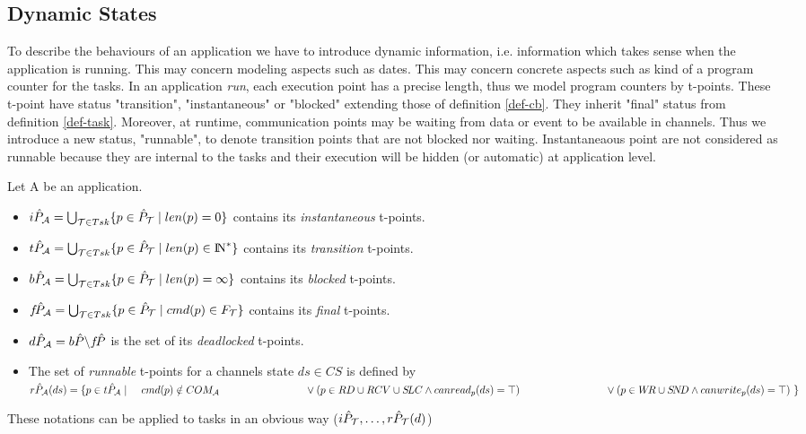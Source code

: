 \documentclass{article}
\newcommand{\NAT}{\mbox{\normalfont I$\!$N}}
\begin{document}
\subsection{Dynamic States}\label{sec-dst}
To describe the behaviours of an application we have to introduce dynamic information, i.e. information which takes sense when the application is running. This may concern modeling aspects such as dates. This may concern concrete aspects such as kind of a program counter for the tasks. In an application {\em run}, each execution point has a precise length, thus we model program counters by t-points. These t-point have status "transition", "instantaneous" or "blocked" extending those of definition \ref{def-cb}. They inherit "final" status from definition \ref{def-task}. Moreover, at runtime, communication points may be waiting from data or event to be available in channels. Thus we introduce a new status, "runnable", to denote transition points that are not blocked nor waiting. Instantaneaous point are not considered as runnable because they are internal to the tasks and their execution will be hidden (or automatic) at application level.
\begin{definition}\label{def-tpstat} Let {\cal A} be an application. 
\begin{itemize}
      \item $i\hat P_{\cal A}=\bigcup_{{\cal T}\in Tsk}\{p\in \hat P_{\cal T}\mid len(p)=0\}$ contains its {\em instantaneous} t-points.
			\item $t\hat P_{\cal A}=\bigcup_{{\cal T}\in Tsk}\{p\in \hat P_{\cal T}\mid len(p)\in\NAT^*\}$ contains its {\em transition} t-points.
			\item $b\hat P_{\cal A}=\bigcup_{{\cal T}\in Tsk}\{p\in \hat P_{\cal T}\mid len(p)=\infty\}$ contains its {\em blocked} t-points.
		 \item $f\!\hat P_{\cal A}=\bigcup_{{\cal T}\in Tsk}\{p\in \hat P_{\cal T}\mid cmd(p)\in F_{\cal T}\}$ contains its {\em final} t-points.
		
		 \item $d\hat P_{\cal A}=b\hat P\backslash f\!\hat P$ is the set of its {\em deadlocked} t-points.
     \item The set of {\em runnable} t-points for a channels state $ds\in CS$ is defined by\\
		$r\hat P_{\cal A}(ds)=\{p\in t\hat P_{\cal A}\mid\;\;\;\; cmd(p)\notin COM_{\cal A}\\
		  \hspace*{2.9cm}\vee(p\in RD\cup RCV\cup S\!LC \wedge canread_p(ds)=\top)\\
			\hspace*{2.9cm}\vee(p\in W\!R\cup S\!N\!D \wedge canwrite_p(ds)=\top)
		   \,\,\}$
\end{itemize}
These notations can be applied to tasks in an obvious way ($i\hat P_{\cal T},\ldots,r\hat P_{\cal T}(d)$)
\end{definition}
\end{document}
